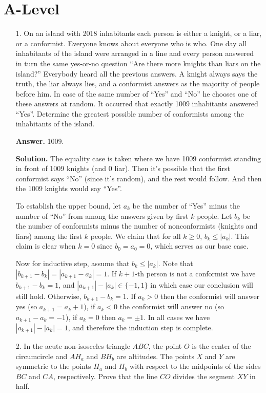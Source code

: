 \documentclass[11pt,a4paper]{article}
\begin{document}
\section*{A-Level}
\begin{enumerate}
	\item[1.]
	On an island with 2018 inhabitants each person is either a knight, or a liar, or a conformist.
	Everyone knows about everyone who is who. One day all inhabitants of the island were arranged
	in a line and every person answered in turn the same yes-or-no question “Are there more knights
	than liars on the island?” Everybody heard all the previous answers. A knight always says the
	truth, the liar always lies, and a conformist answers as the majority of people before him. In
	case of the same number of “Yes” and “No” he chooses one of these answers at random. It
	occurred that exactly 1009 inhabitants answered “Yes”. Determine the greatest possible number
	of conformists among the inhabitants of the island.
	
	\textbf{Answer.} 1009. 
	
	\textbf{Solution.} 
	The equality case is taken where we have 1009 conformist standing in front of 1009 knights (and 0 liar). 
	Then it's possible that the first conformist says ``No'' (since it's random), 
	and the rest would follow. 
	And then the 1009 knights would say ``Yes''. 
	
	To establish the upper bound, let $a_k$ be the number of ``Yes'' minus the number of ``No'' from among the answers given by first $k$ people. 
	Let $b_k$ be the number of conformists minus the number of nonconformists (knights and liars) among the first $k$ people. 
	We claim that for all $k\ge 0$, $b_k\le |a_k|$. 
	This claim is clear when $k=0$ since $b_0=a_0=0$, which serves as our base case. 
	
	Now for inductive step, assume that $b_k\le |a_k|$. 
	Note that $|b_{k+1}-b_k|=|a_{k+1}-a_k|=1$. 
	If $k+1$-th person is not a conformist we have $ b_{k+1}-b_k=1$, 
	and $|a_{k+1}|-|a_k|\in \{-1, 1\}$ 
	in which case our conclusion will still hold. 
	Otherwise, $b_{k+1}-b_k=1$. 
	If $a_k>0$ then the conformist will answer yes (so $a_{k+1}=a_k+1$), 
	if $a_k<0$ the conformist will answer no (so $a_{k+1}-a_k=-1$), 
	if $a_k=0$ then $a_k=\pm 1$. 
	In all cases we have $|a_{k+1}|-|a_k|=1$, 
	and therefore the induction step is complete. 
	
	\item[2.]
	 In the acute non-isosceles triangle $ABC$, the point $O$ is the center of the circumcircle and $AH_a$
	and $BH_b$ are altitudes. The points $X$ and $Y$ are symmetric to the points $H_a$ and $H_b$ with respect
	to the midpoints of the sides $BC$ and $CA$, respectively. Prove that the line $CO$ divides the
	segment $XY$ in half.
	

\end{enumerate}
\end{document}
